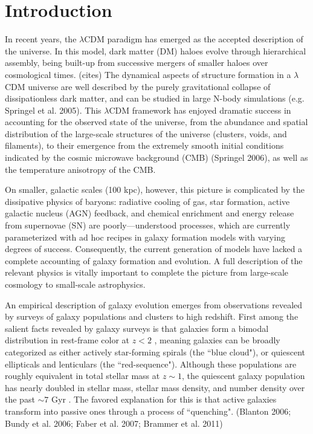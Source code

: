 \chapter{Introduction}

In recent years, the $\lambda$CDM paradigm has emerged as the accepted description of the universe.
In this model, dark matter (DM) haloes evolve through hierarchical assembly, being built-up from successive mergers of smaller haloes over cosmological times. (cites)
The dynamical aspects of structure formation in a $\lambda$CDM universe are well described by the purely gravitational collapse of dissipationless dark matter, and can be studied in large N-body simulations (e.g. Springel et al. 2005).
This $\lambda$CDM framework has enjoyed dramatic success in accounting for the observed state of the universe, from the abundance and spatial distribution of the large-scale structures of the universe (clusters, voids, and filaments), to their emergence from the extremely smooth initial conditions indicated by the cosmic microwave background (CMB) (Springel 2006), as well as the temperature anisotropy of the CMB.

On smaller, galactic scales (100 kpc), however, this picture is complicated by the dissipative physics of baryons:
radiative cooling of gas, star formation, active galactic nucleus (AGN) feedback, and chemical enrichment and energy release from supernovae (SN) are poorly—understood processes, which are currently parameterized with ad hoc recipes in galaxy formation models with varying degrees of success.
Consequently, the current generation of models have lacked a complete accounting of galaxy formation and evolution.
A full description of the relevant physics is vitally important to complete the picture from large-scale cosmology to small-scale astrophysics.

An empirical description of galaxy evolution emerges from observations revealed by surveys of galaxy populations and clusters to high redshift.
First among the salient facts revealed by galaxy surveys is that galaxies form a bimodal distribution in rest-frame color at $z < 2$ \citep{Strateva:2001aa,Baldry:2004aa,Bell:2004aa,Williams:2009tt}, meaning galaxies can be broadly categorized as either actively star-forming spirals (the ``blue cloud"), or quiescent ellipticals and lenticulars (the ``red-sequence").
Although these populations are roughly equivalent in total stellar mass at $z\sim1$, the quiescent galaxy population has nearly doubled in stellar mass, stellar mass density, and number density over the past $\sim7$ Gyr \citep{Arnouts:2007aa,Bell:2004aa,Borch:2006aa,Bundy:2006aa,Brown:2007aa,Faber:2007aa}.
The favored explanation for this is that active galaxies transform into passive ones through a process of ``quenching". (Blanton 2006; Bundy et al. 2006; Faber et al. 2007; Brammer et al. 2011)

